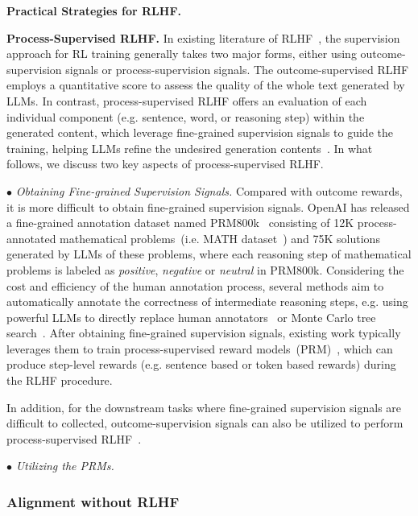 \textbf{Practical Strategies for RLHF.}

\textbf{Process-Supervised RLHF.} In existing literature of RLHF~\cite{Uesato-arxiv-2022-Solving}, the supervision approach for RL training generally takes two major forms, either using outcome-supervision signals or process-supervision signals. The outcome-supervised RLHF employs a quantitative score to assess the quality of the whole text generated by LLMs. In contrast, process-supervised RLHF offers an evaluation of each individual component (e.g. sentence, word, or reasoning step) within the generated content, which leverage fine-grained supervision signals to guide the training, helping LLMs refine the undesired generation contents~\cite{Uesato-arxiv-2022-Solving, Lightman-arxiv-2023-let}. In what follows, we discuss two key aspects of process-supervised RLHF. 

$\bullet$ \textit{Obtaining Fine-grained Supervision Signals.} Compared with outcome rewards, it is more difficult to obtain fine-grained supervision signals. OpenAI has released a fine-grained annotation dataset named PRM800k~\cite{Lightman-arxiv-2023-let} consisting of 12K process-annotated mathematical problems~(i.e. MATH dataset~\cite{Hendrycks-nips-2021-Measuring}) and 75K solutions generated by LLMs of these problems, where each reasoning step of mathematical problems is labeled as \emph{positive}, \emph{negative} or \emph{neutral} in PRM800k. Considering the cost and efficiency of the human annotation process, several methods aim to automatically annotate the correctness of intermediate reasoning steps, {e.g. using powerful LLMs to directly replace human annotators~\cite{Wang-23-arxiv-Shepherd} or Monte Carlo tree search~\cite{Chen-arxiv-2024-AlphaMath}}. After obtaining fine-grained supervision signals, existing work typically leverages them to train process-supervised reward models~(PRM)~\cite{Ma-arxiv-2023-Let, Lightman-arxiv-2023-let}, which can produce step-level rewards (e.g. sentence based or token based rewards) during the RLHF procedure. 

{In addition, for the downstream tasks where fine-grained supervision signals are difficult to collected, outcome-supervision signals can also be utilized to perform process-supervised RLHF~\cite{Xi-arxiv-2024-Training}.}

$\bullet$ \textit{Utilizing the PRMs.}

\subsubsection{Alignment without RLHF}
\label{sec-alignment-withoutRL}

